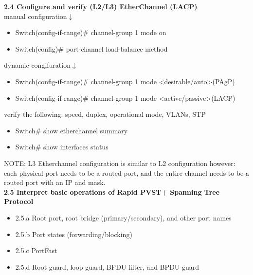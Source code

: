 \documentclass{article}
\begin{document}
\textbf{2.4 Configure and verify (L2/L3) EtherChannel (LACP)}\\

manual configuration$\downarrow$
\begin{itemize}
\item Switch(config-if-range)\# channel-group 1 mode on
\item Switch(config)\# port-channel load-balance method
\end{itemize}

dynamic congifuration$\downarrow$
\begin{itemize}
\item Switch(config-if-range)\# channel-group 1 mode \textless desirable/auto\textgreater (PAgP)
\item Switch(config-if-range)\# channel-group 1 mode \textless active/passive\textgreater (LACP)
\end{itemize}

verify the following: speed, duplex, operational mode, VLANs, STP
\begin{itemize}
\item Switch\# show etherchannel summary
\item Switch\# show interfaces status
\end{itemize}

NOTE: L3 Etherchannel configuration is similar to L2 configuration however: each physical port needs to be a routed port, and the entire channel needs to be a routed port with an IP and mask.\\

  
\textbf{2.5 Interpret basic operations of Rapid PVST+ Spanning Tree Protocol}
\begin{itemize}
\item 2.5.a Root port, root bridge (primary/secondary), and other port names
\item 2.5.b Port states (forwarding/blocking)
\item 2.5.c PortFast
\item 2.5.d Root guard, loop guard, BPDU filter, and BPDU guard
\end{itemize}
\end{document}

